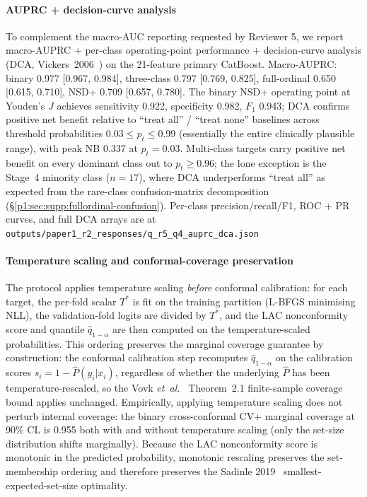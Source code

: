 \paragraph*{AUPRC + decision-curve analysis} To complement the macro-AUC reporting requested by Reviewer 5, we report macro-AUPRC + per-class operating-point performance + decision-curve analysis (DCA, Vickers~2006~\cite{vickers2006dca}) on the 21-feature primary CatBoost. Macro-AUPRC: binary 0.977 [0.967, 0.984], three-class 0.797 [0.769, 0.825], full-ordinal 0.650 [0.615, 0.710], NSD+ 0.709 [0.657, 0.780]. The binary NSD+ operating point at Youden's $J$ achieves sensitivity 0.922, specificity 0.982, $F_1$ 0.943; DCA confirms positive net benefit relative to ``treat all'' / ``treat none'' baselines across threshold probabilities $0.03 \leq p_t \leq 0.99$ (essentially the entire clinically plausible range), with peak NB 0.337 at $p_t{=}0.03$. Multi-class targets carry positive net benefit on every dominant class out to $p_t \geq 0.96$; the lone exception is the Stage~4 minority class ($n{=}17$), where DCA underperforms ``treat all'' as expected from the rare-class confusion-matrix decomposition (\S\ref{p1:sec:supp:fullordinal-confusion}). Per-class precision/recall/F1, ROC + PR curves, and full DCA arrays are at \texttt{outputs/paper1\_r2\_responses/q\_r5\_q4\_auprc\_dca.json}

\paragraph*{Temperature scaling and conformal-coverage preservation} The protocol applies temperature scaling \emph{before} conformal calibration: for each target, the per-fold scalar $T^*$ is fit on the training partition (L-BFGS minimising NLL), the validation-fold logits are divided by $T^*$, and the LAC nonconformity score and quantile $\hat{q}_{1-\alpha}$ are then computed on the temperature-scaled probabilities. This ordering preserves the marginal coverage guarantee by construction: the conformal calibration step recomputes $\hat{q}_{1-\alpha}$ on the calibration scores $s_i = 1 - \hat{P}(y_i | x_i)$, regardless of whether the underlying $\hat{P}$ has been temperature-rescaled, so the Vovk \emph{et~al.}~\cite{vovk2022} Theorem~2.1 finite-sample coverage bound applies unchanged. Empirically, applying temperature scaling does not perturb internal coverage: the binary cross-conformal CV+ marginal coverage at 90\% CL is 0.955 both with and without temperature scaling (only the set-size distribution shifts marginally). Because the LAC nonconformity score is monotonic in the predicted probability, monotonic rescaling preserves the set-membership ordering and therefore preserves the Sadinle 2019~\cite{sadinle2019lac} smallest-expected-set-size optimality.

